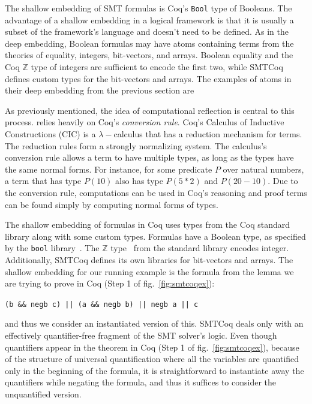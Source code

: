 \documentclass{article}
\begin{document}
	The shallow embedding of SMT formulas
	is Coq's \texttt{Bool} type of 
	Booleans. The advantage of a 
	shallow embedding in a logical 
	framework is that it is usually 
	a subset of the framework's language
	and doesn't need to be defined. 
	As in the deep embedding, Boolean
	formulas may have atoms containing 
	terms from the theories of 
	equality, integers, bit-vectors,
	and arrays. Boolean equality and
	the Coq $\mathbb{Z}$ type of 
	integers are sufficient to encode
	the first two, while SMTCoq 
	defines custom types for the 
	bit-vectors and arrays. The 
	examples of atoms in their 
	deep embedding from the previous
	section are 
	
	
	As previously 
	mentioned, the idea of computational 
	reflection is central to this 
	process. relies heavily on 
	Coq's \textit{conversion rule}.
	Coq's Calculus of Inductive 
	Constructions (CIC) is a 
	$\lambda-$calculus that has a 
	reduction mechanism for terms. The
	reduction rules form a strongly 
	normalizing system. The calculus's
	conversion rule allows a term to 
	have multiple types, as long as the 
	types have the same normal forms. For 
	instance, for some predicate $P$ 
	over natural numbers, a term that 
	has type $P(10)$ also has type 
	$P(5*2)$ and $P(20-10)$. Due 
	to the conversion rule, 
	computations can be used in Coq's 
	reasoning and proof terms can be 
	found simply by computing normal 
	forms of types.
	
	The shallow embedding of formulas in 
	Coq uses types from the 
	Coq standard library along with 
	some custom types. Formulas have a 
	Boolean type, as specified by 
	the \texttt{bool} 
	library~\cite{CoqBool}. The 
	$\mathbb{Z}$ type~\cite{CoqZ}
	from the standard library encodes 
	integer. Additionally, SMTCoq 
	defines its own libraries for 
	bit-vectors and arrays. The shallow 
	embedding for our running example 
	is the formula from the lemma we 
	are trying to prove in Coq
	(Step 1 of fig.~\ref{fig:smtcoqex}):
	\begin{center}
		\texttt{(b \&\& negb c) || (a 
			\&\& negb b) || negb a || c}
	\end{center}	 
	and thus we consider an instantiated
	version of this. SMTCoq deals only 
	with an effectively quantifier-free
	fragment of the SMT solver's logic.
	Even though quantifiers appear in the 
	theorem in Coq (Step 1 of 
	fig.~\ref{fig:smtcoqex}), because
	of the structure of universal 
	quantification where all the variables
	are quantified only in the beginning 
	of the formula, it is straightforward
	to instantiate away the quantifiers
	while negating the formula, and thus
	it suffices to consider the 
	unquantified version.
	
\end{document}
